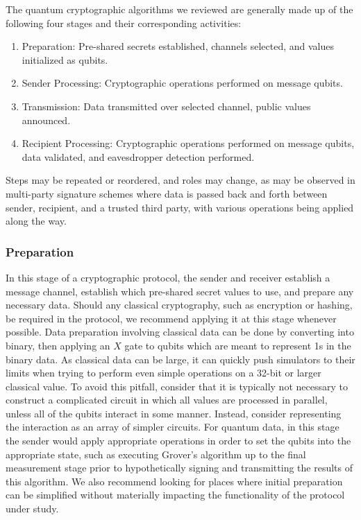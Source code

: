 \documentclass[sigconf]{acmart}
\begin{document}
The quantum cryptographic algorithms we reviewed are generally made up of the following four stages and their corresponding activities:
\begin{enumerate}
\item Preparation: Pre-shared secrets established, channels selected, and values initialized as qubits.
\item Sender Processing: Cryptographic operations performed on message qubits.
\item Transmission: Data transmitted over selected channel, public values announced.
\item Recipient Processing: Cryptographic operations performed on message qubits, data validated, and eavesdropper detection performed.
\end{enumerate}
Steps may be repeated or reordered, and roles may change, as may be observed in multi-party signature schemes where data is passed back and forth between sender, recipient, and a trusted third party, with various operations being applied along the way.

\subsubsection{Preparation}
In this stage of a cryptographic protocol, the sender and receiver establish a message channel, establish which pre-shared secret values to use, and prepare any necessary data. Should any classical cryptography, such as encryption or hashing, be required in the protocol, we recommend applying it at this stage whenever possible. Data preparation involving classical data can be done by converting into binary, then applying an $X$ gate to qubits which are meant to represent 1s in the binary data. As classical data can be large, it can quickly push simulators to their limits when trying to perform even simple operations on a 32-bit or larger classical value. To avoid this pitfall, consider that it is typically not necessary to construct a complicated circuit in which all values are processed in parallel, unless all of the qubits interact in some manner. Instead, consider representing the interaction as an array of simpler circuits. For quantum data, in this stage the sender would apply appropriate operations in order to set the qubits into the appropriate state, such as executing Grover's algorithm up to the final measurement stage prior to hypothetically signing and transmitting the results of this algorithm. We also recommend looking for places where initial preparation can be simplified without materially impacting the functionality of the protocol under study.
\end{document}
